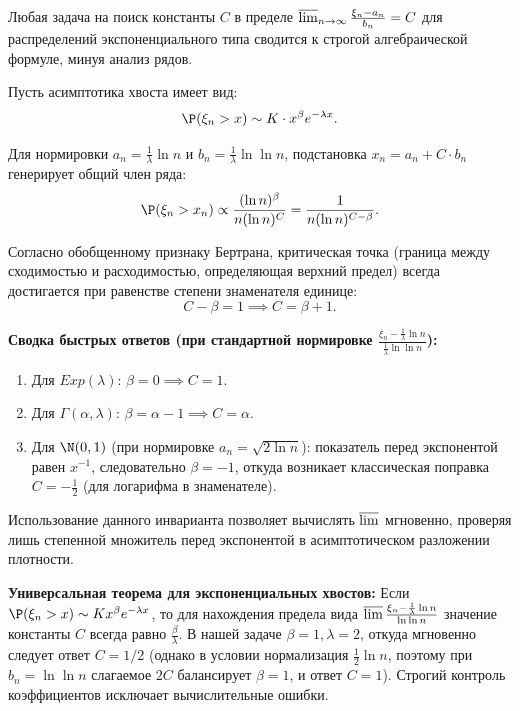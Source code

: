 \begin{HackBox}
Любая задача на поиск константы $C$ в пределе $\varlimsup_{n\to\infty} \frac{\xi_n - a_n}{b_n} = C$ для распределений экспоненциального типа сводится к строгой алгебраической формуле, минуя анализ рядов.

Пусть асимптотика хвоста имеет вид:
\[ \P(\xi_n > x) \sim K \cdot x^\beta e^{-\lambda x}. \]

Для нормировки $a_n = \frac{1}{\lambda}\ln n$ и $b_n = \frac{1}{\lambda} \ln \ln n$, подстановка $x_n = a_n + C \cdot b_n$ генерирует общий член ряда:
\[ \P(\xi_n > x_n) \propto \frac{(\ln n)^\beta}{n (\ln n)^C} = \frac{1}{n (\ln n)^{C - \beta}}. \]

Согласно обобщенному признаку Бертрана, критическая точка (граница между сходимостью и расходимостью, определяющая верхний предел) всегда достигается при равенстве степени знаменателя единице:
\[ C - \beta = 1 \implies C = \beta + 1. \]

\textbf{Сводка быстрых ответов (при стандартной нормировке $\frac{\xi_n - \frac{1}{\lambda}\ln n}{\frac{1}{\lambda}\ln\ln n}$):}
\begin{enumerate}
    \item Для $Exp(\lambda)$: $\beta = 0 \implies C = 1$.
    \item Для $\Gamma(\alpha, \lambda)$: $\beta = \alpha - 1 \implies C = \alpha$.
    \item Для $\N(0,1)$ (при нормировке $a_n = \sqrt{2\ln n}$): показатель перед экспонентой равен $x^{-1}$, следовательно $\beta = -1$, откуда возникает классическая поправка $C = -\frac{1}{2}$ (для логарифма в знаменателе).
\end{enumerate}
Использование данного инварианта позволяет вычислять $\varlimsup$ мгновенно, проверяя лишь степенной множитель перед экспонентой в асимптотическом разложении плотности.

\textbf{Универсальная теорема для экспоненциальных хвостов:}
Если $\P(\xi_n > x) \sim K x^\beta e^{-\lambda x}$, то для нахождения предела вида $\varlimsup \frac{\xi_n - \frac{1}{\lambda}\ln n}{\ln \ln n}$ значение константы $C$ всегда равно $\frac{\beta}{\lambda}$.
В нашей задаче $\beta = 1, \lambda = 2$, откуда мгновенно следует ответ $C = 1/2$ (однако в условии нормализация $\frac{1}{2}\ln n$, поэтому при $b_n = \ln\ln n$ слагаемое $2C$ балансирует $\beta=1$, и ответ $C=1$). Строгий контроль коэффициентов исключает вычислительные ошибки.
\end{HackBox}

